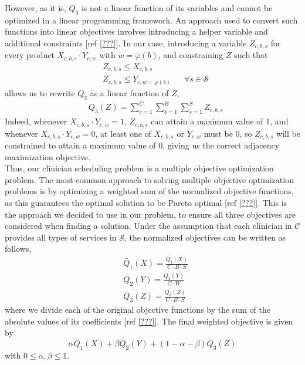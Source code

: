 However, as it is, $Q_3$ is not a linear function of its variables and cannot be optimized in a linear programming framework. An approach used to convert such functions into linear objectives involves introducing a helper variable and additional constraints [ref \ref{???}]. In our case, introducing a variable $Z_{c, b, s}$ for every product $X_{c, b, s} \cdot Y_{c, w}$ with $w = \varphi(b)$, and constraining $Z$ such that 
\begin{align}
	&Z_{c, b, s} \leq X_{c, b, s} \\
	&Z_{c, b, s} \leq Y_{c, w=\varphi(b)} &&\forall s\in\mathcal{S}
\end{align}
allows us to rewrite $Q_3$ as a linear function of $Z$,
\begin{align}
	&Q_3(Z) = \sum_{c=1}^{C} \sum_{b=1}^{B} \sum_{s=1}^{S} Z_{c, b, s}
\end{align}
Indeed, whenever $X_{c, b, s} \cdot Y_{c, w} = 1$, $Z_{c, b, s}$ can attain a maximum value of 1, and whenever $X_{c, b, s} \cdot Y_{c, w} = 0$, at least one of $X_{c, b, s}$ or $Y_{c, w}$ must be 0, so $Z_{c, b, s}$ will be constrained to attain a maximum value of 0, giving us the correct adjacency maximization objective. \\

Thus, our clinician scheduling problem is a multiple objective optimization problem. The most common approach to solving multiple objective optimization problems is by optimizing a weighted sum of the normalized objective functions, as this guarantees the optimal solution to be Pareto optimal [ref \ref{???}]. This is the approach we decided to use in our problem, to ensure all three objectives are considered when finding a solution. Under the assumption that each clinician in $\mathcal{C}$ provides all types of services in $\mathcal{S}$, the normalized objectives can be written as follows,
\begin{align}
	&\bar{Q}_1(X) = \frac{Q_1(X)}{C \cdot B \cdot S} \tag{Block Requests} \label{eqn:norm-obj-block-requests}\\
	&\bar{Q}_2(Y) = \frac{Q_2(Y)}{C \cdot W} \tag{Weekend Requests} \label{eqn:norm-obj-weekend-requests} \\
	&\bar{Q}_3(Z) = \frac{Q_3(Z)}{C \cdot B \cdot S} \tag{Block-Weekend Adjacency} \label{eqn:norm-obj-block-weekend-adj}
\end{align}
where we divide each of the original objective functions by the sum of the absolute values of its coefficients [ref \ref{???}]. The final weighted objective is given by
\begin{equation}
	\alpha \bar{Q}_1(X) + \beta \bar{Q}_2(Y) + (1 - \alpha - \beta) \bar{Q}_3(Z)
\end{equation}
with $0 \leq \alpha, \beta \leq 1$. \\